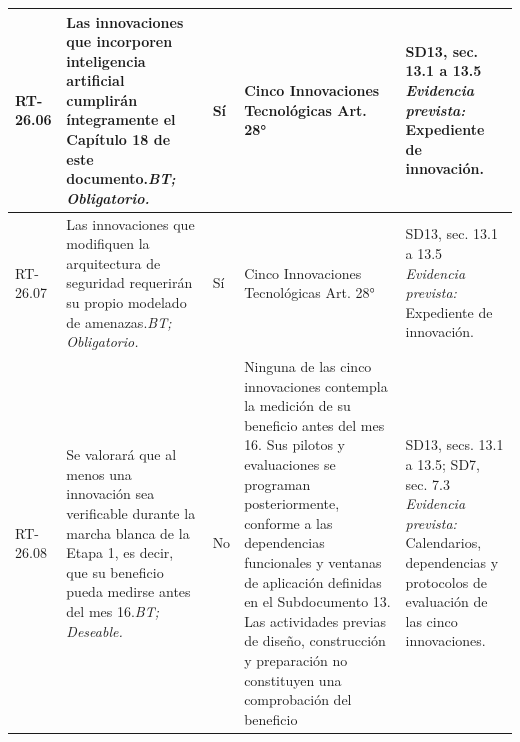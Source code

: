 \begin{paginaHorizontalSynaptix}
\begin{longtable}{|L{0.09\AnchoMatrizTDoce}|L{0.385\AnchoMatrizTDoce}|L{0.065\AnchoMatrizTDoce}|L{0.18\AnchoMatrizTDoce}|L{0.28\AnchoMatrizTDoce}|}
RT-\allowbreak{}26.\allowbreak{}06 &
Las innovaciones que incorporen inteligencia artificial cumplirán íntegramente el Capítulo 18 de este documento.\newline\textit{BT; Obligatorio.} &
Sí &
Cinco Innovaciones Tecnológicas Art. 28° &
SD13, sec. 13.1 a 13.5 \newline\textit{Evidencia prevista:} Expediente de innovación. \\ \hline

RT-\allowbreak{}26.\allowbreak{}07 &
Las innovaciones que modifiquen la arquitectura de seguridad requerirán su propio modelado de amenazas.\newline\textit{BT; Obligatorio.} &
Sí &
Cinco Innovaciones Tecnológicas Art. 28° &
SD13, sec. 13.1 a 13.5 \newline\textit{Evidencia prevista:} Expediente de innovación. \\ \hline

RT-\allowbreak{}26.\allowbreak{}08 &
Se valorará que al menos una innovación sea verificable durante la marcha blanca de la Etapa 1, es decir, que su beneficio pueda medirse antes del mes 16.\newline\textit{BT; Deseable.} &
No &
Ninguna de las cinco innovaciones contempla la medición de
su beneficio antes del mes 16. Sus pilotos y evaluaciones
se programan posteriormente, conforme a las dependencias
funcionales y ventanas de aplicación definidas en el
Subdocumento 13. Las actividades previas de diseño,
construcción y preparación no constituyen una comprobación
del beneficio &
SD13, secs. 13.1 a 13.5; SD7, sec. 7.3
\newline\textit{Evidencia prevista:} Calendarios, dependencias y protocolos de evaluación de las cinco innovaciones.
\\ \hline

\end{longtable}


\end{paginaHorizontalSynaptix}
